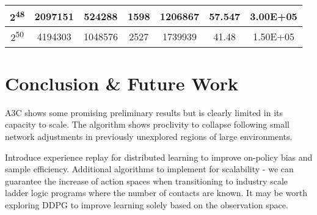 \documentclass[runningheads]{llncs}
\begin{document}
\begin{table}[h]
\begin{tabular}{|c|c|c!{\color{black}\vrule}c|c|c|c|}
		{}2\textsuperscript{48}                                                           & 2097151                                                                                                                    & {}524288           & 1598                                                       & {}1206867                                                                                                                                                      & 57.547                                                      & {}3.00E+05                                                                                                                                                      \\ 
		\hline
		{}2\textsuperscript{50}                                                           & 4194303                                                                                                                    & {}1048576          & 2527                                                       & {}1739939                                                                                                                                                      & 41.48                                                      & {}1.50E+05                                                                                                                                                      \\
		\hline
	\end{tabular}
\end{table}



\section{Conclusion \& Future Work }
A3C shows some promising preliminary results but is clearly limited in its capacity to scale. The algorithm shows proclivity to collapse following small network adjustments in previously unexplored regions of large environments. 


Introduce experience replay for distributed learning to improve on-policy bias and sample efficiency. Additional algorithms to implement for scalability - we can guarantee the increase of action spaces when transitioning to industry scale ladder logic programs where the number of contacts are known. It may be worth exploring DDPG to improve learning solely based on the observation space. 
\end{document}
